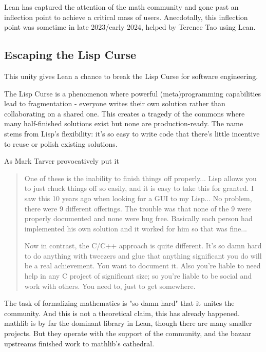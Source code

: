 \documentclass{article}
\begin{document}
Lean has captured the attention of the math community and gone past an inflection point to achieve a critical mass of users. Anecdotally, this inflection point was sometime in late 2023/early 2024, helped by Terence Tao using Lean.

\subsection{Escaping the Lisp Curse}

This unity gives Lean a chance to break the Lisp Curse for software engineering.

The Lisp Curse is a phenomenon where powerful (meta)programming capabilities lead to fragmentation - everyone writes their own solution rather than collaborating on a shared one. This creates a tragedy of the commons where many half-finished solutions exist but none are production-ready. The name stems from Lisp's flexibility: it's so easy to write code that there's little incentive to reuse or polish existing solutions.

As Mark Tarver provocatively put it 

\begin{quote}
  One of these is the inability to finish things off properly... Lisp allows you to just chuck things off so easily, and it is easy to take this for granted. I saw this 10 years ago when looking for a GUI to my Lisp... No problem, there were 9 different offerings. The trouble was that none of the 9 were properly documented and none were bug free. Basically each person had implemented his own solution and it worked for him so that was fine...

  Now in contrast, the C/C++ approach is quite different. It's so damn hard to do anything with tweezers and glue that anything significant you do will be a real achievement. You want to document it. Also you're liable to need help in any C project of significant size; so you're liable to be social and work with others. You need to, just to get somewhere.
\end{quote}

The task of formalizing mathematics is "so damn hard" that it unites the community. And this is not a theoretical claim, this has already happened. mathlib is by far the dominant library in Lean, though there are many smaller projects. But they operate with the support of the community, and the bazaar  upstreams finished work to mathlib's cathedral. 
\end{document}
